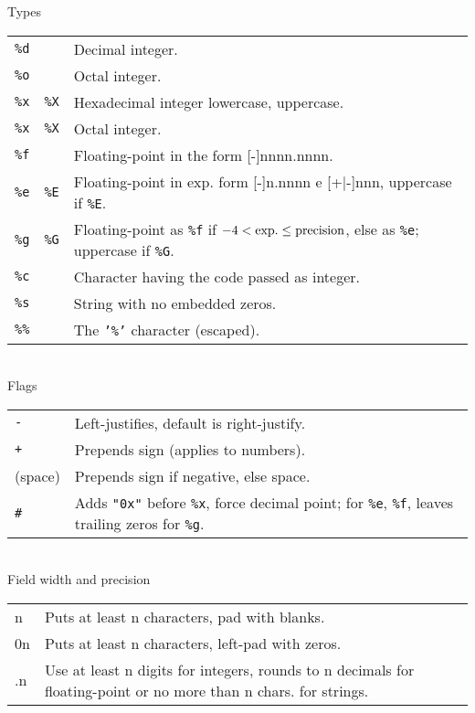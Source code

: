 \hangpar \textsf{Types}\\
\begin{tabular}{@{}llp{}}
    \texttt{\%d} & & Decimal integer. \\
    \texttt{\%o} & & Octal integer. \\
    \texttt{\%x} & \texttt{\%X} & Hexadecimal integer lowercase, uppercase. \\
    \texttt{\%x} & \texttt{\%X} & Octal integer. \\
    \texttt{\%f} & & Floating-point in the form [-]nnnn.nnnn. \\
    \texttt{\%e} & \texttt{\%E} & Floating-point in exp. form [-]n.nnnn e [+|-]nnn,
    uppercase if \texttt{\%E}. \\
    \texttt{\%g} & \texttt{\%G} & Floating-point as \texttt{\%f} if $-4<\rm{exp.}\leq precision$, else as \texttt{\%e}; uppercase if \texttt{\%G}. \\
    \texttt{\%c} & & Character having the code passed as integer. \\
    \texttt{\%s} & & String with no embedded zeros. \\
    \texttt{\%\%} & & The \texttt{'\%'} character (escaped). \\
\end{tabular}\\

\hangpar \textsf{Flags}\\
\begin{tabular}{@{}lp{}}
\texttt{-} & Left-justifies, default is right-justify. \\
\texttt{+} & Prepends sign (applies to numbers). \\
(space) & Prepends sign if negative, else space. \\
\texttt{\#} & Adds \texttt{"0x"} before \texttt{\%x}, force decimal point; for \texttt{\%e}, \texttt{\%f}, leaves trailing zeros for \texttt{\%g}. \\
\end{tabular}\\

\hangpar \textsf{Field width} and \textsf{precision}\\
\begin{tabular}{@{}lp{}}
\textsf{n} & Puts at least \textsf{n} characters, pad with blanks. \\
\textsf{0n} & Puts at least \textsf{n} characters, left-pad with zeros. \\
\textsf{.n} & Use at least \textsf{n} digits for integers, rounds to \textsf{n} decimals for floating-point or no more than \textsf{n} chars. for strings. \\
\end{tabular}

